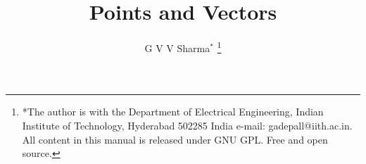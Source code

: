 \documentclass[journal,12pt,twocolumn]{IEEEtran}
\begin{document}
\let\StandardTheFigure\thefigure
\let\vec\mathbf
\renewcommand{\thefigure}{\theproblem}



\def\putbox#1#2#3{\makebox[0in][l]{\makebox[#1][l]{}\raisebox{\baselineskip}[0in][0in]{\raisebox{#2}[0in][0in]{#3}}}}
     \def\rightbox#1{\makebox[0in][r]{#1}}
     \def\centbox#1{\makebox[0in]{#1}}
     \def\topbox#1{\raisebox{-\baselineskip}[0in][0in]{#1}}
     \def\midbox#1{\raisebox{-0.5\baselineskip}[0in][0in]{#1}}

\vspace{3cm}

\title{
Points and Vectors
}
\author{ G V V Sharma$^{*}$%
	\thanks{*The author is with the Department
		of Electrical Engineering, Indian Institute of Technology, Hyderabad
		502285 India e-mail:  gadepall@iith.ac.in. All content in this manual is released under GNU GPL.  Free and open source.}
	
}	


%
%
%

% 
%
\end{document}
